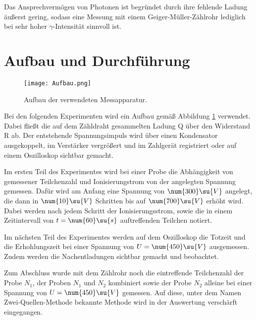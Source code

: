 Das Ansprechvermögen von Photonen ist begründet durch ihre fehlende Ladung äußerst
gering, sodass eine Messung mit einem Geiger-Müller-Zählrohr lediglich bei
sehr hoher $\gamma$-Intensität sinnvoll ist.

\newpage

\section{Aufbau und Durchführung}

\begin{figure}
  \centering
  \texttt{[image: Aufbau.png]}
  \caption{Aufbau der verwendeten Messapparatur. \cite{anleitung01}}
  \label{fig:Aufbau}
\end{figure}

Bei den folgenden Experimenten wird ein Aufbau gemäß Abbildung \ref{fig:Aufbau}
verwendet. Dabei fließt die auf dem Zähldraht gesammelten Ladung Q über
den Widerstand R ab. Der entstehende Spannungsimpuls wird über einen Kondensator
ausgekoppelt, im Verstärker vergrößert und im Zahlgerät registriert oder auf einem
Oszilloskop sichtbar gemacht.

Im ersten Teil des Experimentes wird bei einer Probe die Abhängigkeit von gemessener
Teilchenzahl und Ionisierungstrom von der angelegten Spannung gemessen. Dafür wird
am Anfang eine Spannung von $\num{300}\su{V}$ angelegt, die dann in $\num{10}\su{V}$ Schritten
bis auf $\num{700}\su{V}$ erhöht wird.
Dabei werden nach jedem Schritt der Ionisierungsstrom, sowie die in einem
Zeitintervall von $t = \num{60}\su{s}$ auftreffenden Teilchen notiert.

Im nächsten Teil des Experimentes werden auf dem Oszilloskop die Totzeit und die
Erhohlungszeit bei einer Spannung von $U = \num{450}\su{V}$ ausgemessen. Zudem werden
die Nachentladungen sichtbar gemacht und beobachtet.

Zum Abschluss wurde mit dem Zählrohr noch die eintreffende Teilchenzahl der
Probe $N_1$, der Proben $N_1$ und $N_2$ kombiniert sowie der Probe $N_2$ alleine
bei einer Spannung von $U = \num{450}\su{V}$ gemessen. Auf diese, unter dem Namen
Zwei-Quellen-Methode bekannte Methode wird in der Auswertung verschärft eingegangen.
